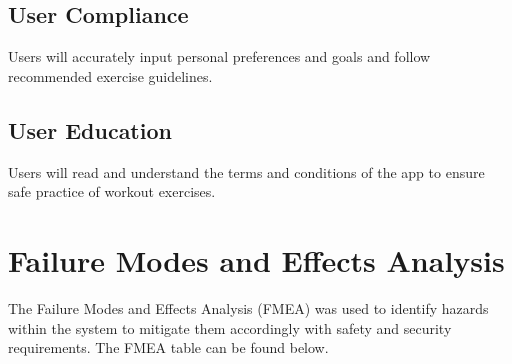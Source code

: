 \documentclass{article}
\begin{document}
\subsection{User Compliance}
Users will accurately input personal preferences and goals and follow recommended exercise guidelines.
\subsection{User Education}
Users will read and understand the terms and conditions of the app to ensure safe practice of workout exercises.

\section{Failure Modes and Effects Analysis}

The Failure Modes and Effects Analysis (FMEA) was used to identify hazards within the system to mitigate them accordingly with safety and security requirements. The FMEA table can be found below. 
\end{document}
